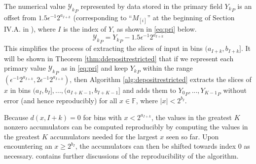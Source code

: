 \documentclass[12pt]{article}
\providecommand{\F}{\ensuremath{\mathbb{F}}}
\theoremstyle{definition}
\numberwithin{equation}{section}
\numberwithin{figure}{section}
\begin{document}
      The numerical value ${\mathcal{Y}_k}_P$ represented by data stored in the primary field ${Y_k}_P$ is an offset from $1.5\epsilon^{-1}2^{a_{I + k}}$ (corresponding to ``$M_{[i]}$'' at the beginning of Section IV.A. in \cite{repsum}), where $I$ is the index of $Y$, as shown in  \eqref{eq:pri} below.
      \begin{equation}
        {\mathcal{Y}_k}_P = {Y_k}_P - 1.5\epsilon^{-1}2^{a_{I + k}}
        \label{eq:pri}
      \end{equation}
      This simplifies the process of extracting the slices of input in bins $(a_{I + k}, b_{I + k}]$. It will be shown in Theorem \ref{thm:ddepositrestricted} that if we represent each primary value ${\mathcal{Y}_k}_P$ as in \eqref{eq:pri} and keep ${Y_k}_P$ within the range $(\epsilon^{-1} 2^{a_{I + k}}, 2 \epsilon^{-1} 2^{a_{I + k}})$, then Algorithm \ref{alg:depositrestricted} extracts the slices of $x$ in bins $(a_I, b_I], ..., (a_{I + K - 1}, b_{I + K - 1}]$ and adds them to ${Y_0}_P, ..., {Y_{K - 1}}_P$ without error (and hence reproducibly) for all $x \in \F$, where $|x| < 2^{b_I}$.

      Because $d(x, I + k) = 0$ for bins with $x < 2^{a_{I + k}}$, the values in the greatest $K$ nonzero accumulators can be computed reproducibly by computing the values in the greatest $K$ accumulators needed for the largest $x$ seen so far. Upon encountering an $x \geq 2^{b_I}$, the accumulators can then be shifted towards index $0$ as necessary. \cite{repsum} contains further discussions of the reproducibility of the algorithm.
\end{document}
